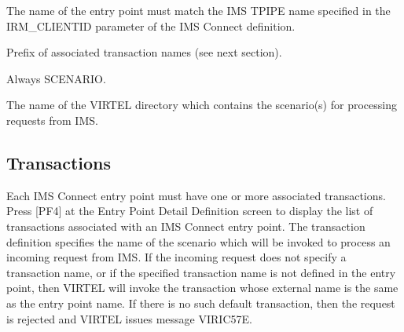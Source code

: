 \documentclass[letterpaper,10pt,english]{sphinxmanual}
\begin{document}
\sphinxAtStartPar
{}
\begin{description}
\sphinxAtStartPar
The name of the entry point must match the IMS TPIPE name specified
in the IRM\_CLIENTID parameter of the IMS Connect definition.

\sphinxAtStartPar
Prefix of associated transaction names (see next section).

\sphinxAtStartPar
Always SCENARIO.

\sphinxAtStartPar
The name of the VIRTEL directory which contains the scenario(s) for
processing requests from IMS.

\end{description}

\ignorespaces 

\subsection{Transactions}
\label{\detokenize{connectivity_guide:transactions}}\label{\detokenize{connectivity_guide:index-25}}
\sphinxAtStartPar
Each IMS Connect entry point must have one or more associated transactions. Press {[}PF4{]} at the Entry Point Detail Definition screen to display the list of transactions associated with an IMS Connect entry point. The transaction definition specifies the name of the scenario which will be invoked to process an incoming request from IMS. If the incoming request does not specify a transaction name, or if the specified transaction name is not defined in the entry point, then VIRTEL will invoke the transaction whose external name is the same as the entry point name. If there is no such default transaction, then the request is rejected and VIRTEL issues message VIRIC57E.
\end{document}

